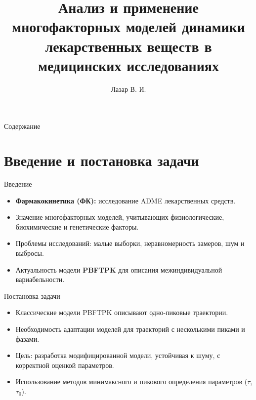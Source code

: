 \documentclass{beamer}
\title{Анализ и применение многофакторных моделей динамики лекарственных веществ в медицинских исследованиях}
\author{Лазар В. И.}
\institute{ВМК МГУ}
\begin{document}
\begin{frame}
	\titlepage
\end{frame}

\begin{frame}{Содержание}
	\tableofcontents
\end{frame}

\section{Введение и постановка задачи}
\begin{frame}{Введение}
	\begin{itemize}
		\item \textbf{Фармакокинетика (ФК):} исследование ADME лекарственных средств.
		\item Значение многофакторных моделей, учитывающих физиологические, биохимические и генетические факторы.
		\item Проблемы исследований: малые выборки, неравномерность замеров, шум и выбросы.
		\item Актуальность модели \textbf{PBFTPK} для описания межиндивидуальной вариабельности.
	\end{itemize}
\end{frame}

\begin{frame}{Постановка задачи}
	\begin{itemize}
		\item Классические модели PBFTPK описывают одно-пиковые траектории.
		\item Необходимость адаптации моделей для траекторий с несколькими пиками и фазами.
		\item Цель: разработка модифицированной модели, устойчивая к шуму, с корректной оценкой параметров.
		\item Использование методов минимаксного и пикового определения параметров ($\tau$, $\tau_0$).
	\end{itemize}
\end{frame}

\end{document}
